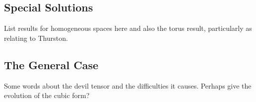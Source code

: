 \documentclass[a4paper, 12pt]{amsart}
\begin{document}
\subsection{Special Solutions}
\label{subsec:xcf_special}


{\color{red} List results for homogeneous spaces here and also the torus result, particularly as relating to Thurston.}

\subsection{The General Case}
\label{subsec:xcf_general}

{\color{red} Some words about the devil tensor and the difficulties it causes. Perhaps give the evolution of the cubic form?}

\section*{}

\printbibliography
\end{document}
